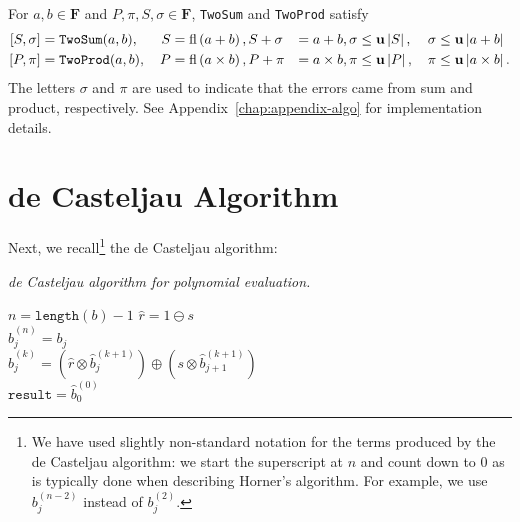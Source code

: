 \begin{theorem}\label{thm:eft}
For \(a, b \in \mathbf{F}\) and \(P, \pi, S, \sigma \in \mathbf{F}\),
\texttt{TwoSum} and \texttt{TwoProd} satisfy
\begin{alignat}{4}
\left[S, \sigma\right] &= \mathtt{TwoSum}(a, b), & \, S &= \operatorname{fl}\left(a + b\right),
  S + \sigma &= a + b, \sigma &\leq \mathbf{u} \left|S\right|,
  & \, \sigma &\leq \mathbf{u} \left|a + b\right| \\
\left[P, \pi\right] &= \mathtt{TwoProd}(a, b),
  & \, P &= \operatorname{fl}\left(a \times b\right), P + \pi &= a \times b,
  \pi &\leq \mathbf{u} \left|P\right|,
  & \, \pi &\leq \mathbf{u} \left|a \times b\right|.
\end{alignat}
The letters \(\sigma\) and \(\pi\) are used to indicate that the
errors came from sum and product, respectively. See
Appendix~\ref{chap:appendix-algo} for implementation details.
\end{theorem}

\section{de Casteljau Algorithm}

Next, we recall\footnote{We have used slightly non-standard notation for the
terms produced by the de Casteljau algorithm: we start the superscript at
\(n\) and count down to \(0\) as is typically done when describing Horner's
algorithm. For example, we use \(b_j^{(n - 2)}\) instead of
\(b_j^{(2)}\).} the de Casteljau algorithm:

\begin{breakablealgorithm}
  \caption{\textit{de Casteljau algorithm for polynomial evaluation.}}
  \label{alg:de-casteljau}

  \begin{algorithmic}
      \State \(n = \texttt{length}(b) - 1\)
      \State \(\widehat{r} = 1 \ominus s\)
      \\
        \State \(\widehat{b}_j^{(n)} = b_j\)
      \EndFor
      \\
          \State \(\widehat{b}_j^{(k)} = \left(
              \widehat{r} \otimes \widehat{b}_j^{(k + 1)}\right) \oplus
              \left(s \otimes \widehat{b}_{j + 1}^{(k + 1)}\right)\)
        \EndFor
      \EndFor
      \\
      \State \(\mathtt{result} = \widehat{b}_0^{(0)}\)
    \EndFunction
  \end{algorithmic}
\end{breakablealgorithm}

